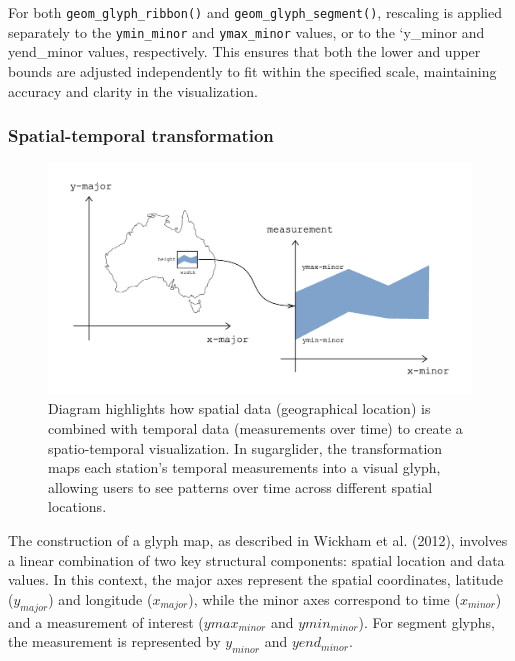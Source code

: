 For both \texttt{geom\_glyph\_ribbon()} and \texttt{geom\_glyph\_segment()}, rescaling is applied separately to the \texttt{ymin\_minor} and \texttt{ymax\_minor} values, or to the `y\_minor and yend\_minor values, respectively. This ensures that both the lower and upper bounds are adjusted independently to fit within the specified scale, maintaining accuracy and clarity in the visualization.

\hypertarget{spatial-temporal-transformation}{%
\subsubsection{Spatial-temporal transformation}\label{spatial-temporal-transformation}}

\begin{figure}
\includegraphics[width=17.71in]{figures/diagram-transformation} \caption{Diagram highlights how spatial data (geographical location) is combined with temporal data (measurements over time) to create a spatio-temporal visualization. In sugarglider, the transformation maps each station's temporal measurements into a visual glyph, allowing users to see patterns over time across different spatial locations.}\label{fig:unnamed-chunk-6}
\end{figure}

The construction of a glyph map, as described in Wickham et al. (2012), involves a linear combination of two key structural components: spatial location and data values. In this context, the major axes represent the spatial coordinates, latitude (\(y_{major}\)) and longitude (\(x_{major}\)), while the minor axes correspond to time (\(x_{minor}\)) and a measurement of interest (\(ymax_{minor}\) and \(ymin_{minor}\)). For segment glyphs, the measurement is represented by \(y_{minor}\) and \(yend_{minor}\).

